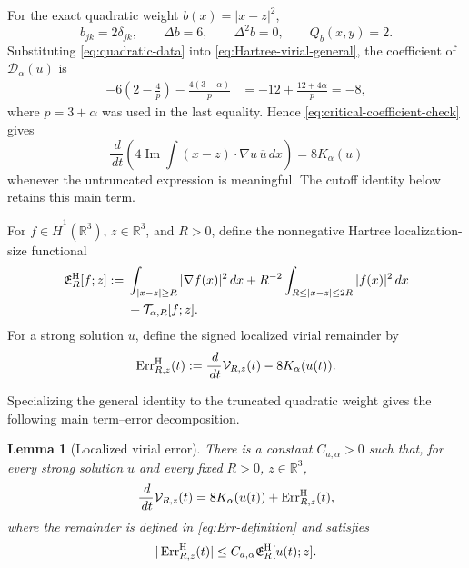 \documentclass[preprint,12pt]{elsarticle}
\numberwithin{equation}{section}
\newtheorem{lemma}[theorem]{Lemma}
\theoremstyle{remark}
\newcommand{\R}{\mathbb R}
\newcommand{\dd}{\,d}
\newcommand{\Dcal}{\mathcal D_{\alpha}}
\newcommand{\Kcal}{K_{\alpha}}
\newcommand{\Vcal}{\mathcal V}
\newcommand{\Ttail}[1]{\mathcal T_{\alpha,#1}}
\newcommand{\Err}{\operatorname{Err}}
\begin{document}
For the exact quadratic weight $b(x)=|x-z|^2$,
\begin{equation}\label{eq:quadratic-data}
  b_{jk}=2\delta_{jk},
  \qquad \Delta b=6,
  \qquad \Delta^2b=0,
  \qquad Q_b(x,y)=2.
\end{equation}
Substituting \eqref{eq:quadratic-data} into \eqref{eq:Hartree-virial-general}, the coefficient of $\Dcal(u)$ is
\begin{align}
  -6\left(2-\frac4p\right)
  -\frac{4(3-\alpha)}p
  &=-12+\frac{12+4\alpha}{p}
  =-8,
  \label{eq:critical-coefficient-check}
\end{align}
where $p=3+\alpha$ was used in the last equality. Hence \eqref{eq:critical-coefficient-check} gives
\begin{equation}\label{eq:exact-quadratic-virial}
  \frac{\dd}{\dd t}
  \left(4\operatorname{Im}\int(x-z)\cdot\nabla u\,\overline u\dd x\right)
  =8\Kcal(u)
\end{equation}
whenever the untruncated expression is meaningful. The cutoff identity below retains this main term.

For $f\in\dot H^1(\R^3)$, $z\in\R^3$, and $R>0$, define the nonnegative Hartree localization-size functional
\begin{align}
  \mathfrak E_R^{\rm H}[f;z]
  :={}&\int_{|x-z|\ge R}|\nabla f(x)|^2\dd x
  +R^{-2}\int_{R\le|x-z|\le2R}|f(x)|^2\dd x\notag\\
  &+\Ttail{R}[f;z].
  \label{eq:Hartree-error-functional}
\end{align}
For a strong solution $u$, define the signed localized virial remainder by
\begin{equation}\label{eq:Err-definition}
  \Err_{R,z}^{\rm H}(t)
  :=\frac{\dd}{\dd t}\Vcal_{R,z}(t)-8\Kcal(u(t)).
\end{equation}

Specializing the general identity to the truncated quadratic weight gives the following main term--error decomposition.

\begin{lemma}[Localized virial error]\label{lem:localized-Hartree-error}
There is a constant $C_{a,\alpha}>0$ such that, for every strong solution $u$ and every fixed $R>0$, $z\in\R^3$,
\begin{equation}\label{eq:localized-virial-decomposition}
  \frac{\dd}{\dd t}\Vcal_{R,z}(t)
  =8\Kcal(u(t))+\Err_{R,z}^{\rm H}(t),
\end{equation}
where the remainder is defined in \eqref{eq:Err-definition} and satisfies
\begin{equation}\label{eq:localized-virial-error-bound}
  |\Err_{R,z}^{\rm H}(t)|
  \le C_{a,\alpha}\mathfrak E_R^{\rm H}[u(t);z].
\end{equation}
\end{lemma}
\end{document}
